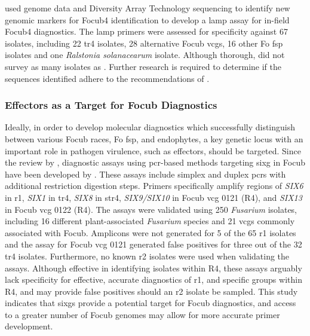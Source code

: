 \textcite{Ordonez2019} used genome data and Diversity Array Technology sequencing to identify new genomic markers for \ac{Focub4} identification to develop a \ac{lamp} assay for in-field \ac{Focub4} diagnostics. The \ac{lamp} primers were assessed for specificity against 67 isolates, including 22 \ac{tr4} isolates, 28 alternative \ac{Focub} \acp{vcg}, 16 other \ac{Fo} \ac{fsp} isolates and one \textit{Ralstonia solanacearum} isolate. Although thorough, \textcite{Ordonez2019}  did not survey as many isolates as \textcite{Magdama2019}. Further research is required to determine if the sequences identified adhere to the recommendations of \textcite{Magdama2019}. 

\subsubsection{Effectors as a Target for \acl{Focub} Diagnostics}

Ideally, in order to develop molecular diagnostics which successfully distinguish between various \ac{Focub} races, \ac{Fo} \ac{fsp}, and endophytes, a key genetic locus with an important role in pathogen virulence, such as effectors, should be targeted. Since the review by \textcite{Magdama2019}, diagnostic assays using \ac{pcr}-based methods targeting \ac{sixg} in \ac{Focub} have been developed by \textcite{Carvalhais2019}. These assays include simplex and duplex \acp{pcr} with additional restriction digestion steps. Primers specifically amplify regions of \textit{SIX6} in \ac{r1}, \textit{SIX1} in \ac{tr4}, \textit{SIX8} in \ac{str4}, \textit{SIX9/SIX10} in \ac{Focub} \ac{vcg} 0121 (R4), and \textit{SIX13} in \ac{Focub} \ac{vcg} 0122 (R4). The assays were validated using 250 \textit{Fusarium} isolates, including 16 different plant-associated \textit{Fusarium} species and 21 \acp{vcg}  commonly associated with \ac{Focub}. Amplicons were not generated for 5 of the 65 \ac{r1} isolates and the assay for \ac{Focub} \ac{vcg} 0121 generated false positives for three out of the 32 \ac{tr4} isolates. Furthermore, no known \ac{r2} isolates were used when validating the assays. Although effective in identifying isolates within R4, these assays arguably lack specificity for effective, accurate diagnostics of \ac{r1}, and specific groups within R4, and may provide false positives should an \ac{r2} isolate be sampled. This study indicates that \acp{sixg} provide a potential target for \ac{Focub} diagnostics, and access to a greater number of \ac{Focub} genomes may allow for more accurate primer development.  

